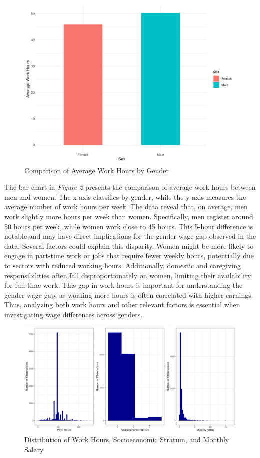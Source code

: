\documentclass[11pt,a4paper,onecolumn]{article}
\begin{document}
    \begin{figure}[H]
        \includegraphics[scale=0.6]{../views/P02_work_hours_sex.png}   
        \caption{Comparison of Average Work Hours by Gender} \label{fig:P02}
    \end{figure}

    The bar chart in \textit{Figure 2} presents the comparison of average work hours between men and women. The x-axis classifies by gender, while the y-axis measures the average number of work hours per week. The data reveal that, on average, men work slightly more hours per week than women. Specifically, men register around 50 hours per week, while women work close to 45 hours. This 5-hour difference is notable and may have direct implications for the gender wage gap observed in the data. Several factors could explain this disparity. Women might be more likely to engage in part-time work or jobs that require fewer weekly hours, potentially due to sectors with reduced working hours. Additionally, domestic and caregiving responsibilities often fall disproportionately on women, limiting their availability for full-time work. This gap in work hours is important for understanding the gender wage gap, as working more hours is often correlated with higher earnings. Thus, analyzing both work hours and other relevant factors is essential when investigating wage differences across genders.

    \begin{figure}[H]
        \includegraphics[scale=0.5]{../views/P03_histograms_combined.png}   
        \caption{Distribution of Work Hours, Socioeconomic Stratum, and Monthly Salary} \label{fig:P03}
    \end{figure}
\end{document}

